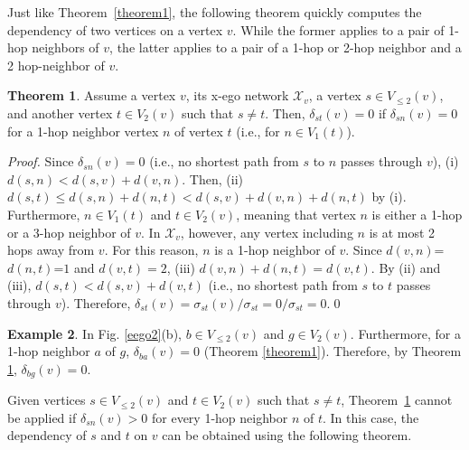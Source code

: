 \documentclass[journal]{IEEEtran}
\newcommand{\D}[3]{\delta_{{#1}{#2}}({#3})}
\newcommand{\V}[2]{V_{#2}({#1})}
\newcommand{\LV}[2]{V_{\le #2}({#1})}
\newcommand{\XN}[1]{\mathcal{X}_{{#1}}}
\theoremstyle{definition}
\newtheorem{theorem}{Theorem}[section]
\newtheorem{example}[theorem]{Example}
\begin{document}
Just like Theorem~\ref{theorem1}, the following theorem quickly computes the dependency of two vertices on a vertex $v$.
While the former applies to a pair of 1-hop neighbors of $v$, the latter applies to a pair of a 1-hop or 2-hop neighbor and a 2 hop-neighbor of $v$.

\begin{theorem}
\label{theorem3} 
Assume a vertex $v$, its x-ego network $\XN{v}$, a vertex $s \in \LV{v}{2}$, and another vertex $t \in \V{v}{2}$ such that $s \ne t$.
Then, $\D{s}{t}{v} = 0$ if $\D{s}{n}{v} = 0$ for a 1-hop neighbor vertex $n$ of vertex $t$ (i.e., for $n \in \V{t}{1}$).
\begin{proof}
Since $\D{s}{n}{v} = 0$ (i.e., no shortest path from $s$ to $n$ passes through $v$), (i) $d(s, n) < d(s, v) +d(v, n)$.
Then, (ii) $d(s, t) \le d(s, n) + d(n, t) < d(s, v) + d(v, n) + d(n, t)$ by (i).
Furthermore, $n \in \V{t}{1}$ and $t \in \V{v}{2}$, meaning that vertex $n$ is either a 1-hop or a 3-hop neighbor of $v$.
In $\XN{v}$, however, any vertex including $n$ is at most 2 hops away from $v$.
For this reason, $n$ is a 1-hop neighbor of $v$.
Since $d(v, n)$=$d(n, t)$=$1$ and $d(v, t)=2$, (iii) $d(v, n) + d(n, t) = d(v, t)$. 
By (ii) and (iii), $d(s, t) < d(s, v) +d(v, t)$ (i.e., no shortest path from $s$ to $t$ passes through $v$).
Therefore, $\D{s}{t}{v}  = \sigma_{st}(v)/\sigma_{st} = 0/\sigma_{st} = 0$.\hfill\qed
\end{proof}
\end{theorem}

\begin{example}
In Fig. \ref{eego2}(b), $b \in \LV{v}{2}$ and $g \in \V{v}{2}$. 
Furthermore, for a 1-hop neighbor $a$ of $g$, $\D{b}{a}{v}=0$ (Theorem \ref{theorem1}).
Therefore, by Theorem \ref{theorem3}, $\D{b}{g}{v}=0$.
\end{example}

Given vertices $s \in \LV{v}{2}$ and $t \in \V{v}{2}$ such that $s \ne t$, Theorem~\ref{theorem3} cannot be applied if $\D{s}{n}{v} > 0$ for every 1-hop neighbor $n$ of $t$.
In this case, the dependency of $s$ and $t$ on $v$ can be obtained using the following theorem.
\end{document}
